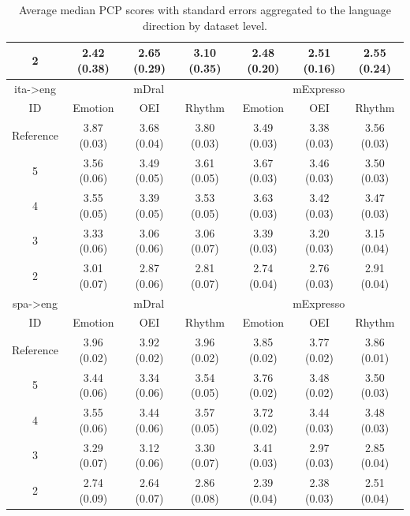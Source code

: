 \begin{table}[!ht]
\begin{tabular}{c|ccc|ccc}
2 & 2.42 (0.38) & 2.65 (0.29) & 3.10 (0.35) & 2.48 (0.20) & 2.51 (0.16) & 2.55 (0.24)\\
\hline
ita->eng & \multicolumn{3}{c|}{mDral} & \multicolumn{3}{c|}{mExpresso}\\
\hline
ID & Emotion & OEI & Rhythm & Emotion & OEI & Rhythm \\
\hline
Reference & 3.87 (0.03) & 3.68 (0.04) & 3.80 (0.03) & 3.49 (0.03) & 3.38 (0.03) & 3.56 (0.03)\\
5 & 3.56 (0.06) & 3.49 (0.05) & 3.61 (0.05) & 3.67 (0.03) & 3.46 (0.03) & 3.50 (0.03)\\
4 & 3.55 (0.05) & 3.39 (0.05) & 3.53 (0.05) & 3.63 (0.03) & 3.42 (0.03) & 3.47 (0.03)\\
3 & 3.33 (0.06) & 3.06 (0.06) & 3.06 (0.07) & 3.39 (0.03) & 3.20 (0.03) & 3.15 (0.04)\\
2 & 3.01 (0.07) & 2.87 (0.06) & 2.81 (0.07) & 2.74 (0.04) & 2.76 (0.03) & 2.91 (0.04)\\
\hline
spa->eng & \multicolumn{3}{c|}{mDral} & \multicolumn{3}{c|}{mExpresso}\\
\hline
ID & Emotion & OEI & Rhythm & Emotion & OEI & Rhythm \\
\hline
Reference & 3.96 (0.02) & 3.92 (0.02) & 3.96 (0.02) & 3.85 (0.02) & 3.77 (0.02) & 3.86 (0.01)\\
5 & 3.44 (0.06) & 3.34 (0.06) & 3.54 (0.05) & 3.76 (0.02) & 3.48 (0.02) & 3.50 (0.03)\\
4 & 3.55 (0.06) & 3.44 (0.06) & 3.57 (0.05) & 3.72 (0.02) & 3.44 (0.03) & 3.48 (0.03)\\
3 & 3.29 (0.07) & 3.12 (0.06) & 3.30 (0.07) & 3.41 (0.03) & 2.97 (0.03) & 2.85 (0.04)\\
2 & 2.74 (0.09) & 2.64 (0.07) & 2.86 (0.08) & 2.39 (0.04) & 2.38 (0.03) & 2.51 (0.04)\\
\hline
\end{tabular}
\caption{\label{tab:pcp_human_evaluation_full_table} Average median PCP scores with standard errors aggregated to the language direction by dataset level.}
\end{table}

